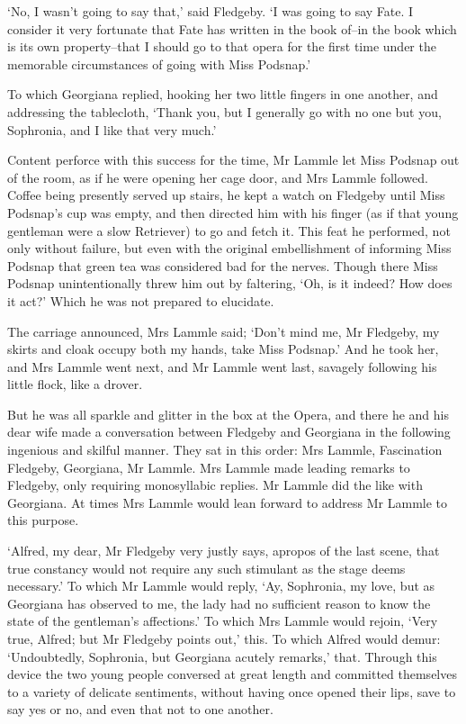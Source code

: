 ‘No, I wasn’t going to say that,’ said Fledgeby. ‘I was going to say
Fate. I consider it very fortunate that Fate has written in the book
of--in the book which is its own property--that I should go to that
opera for the first time under the memorable circumstances of going with
Miss Podsnap.’

To which Georgiana replied, hooking her two little fingers in one
another, and addressing the tablecloth, ‘Thank you, but I generally go
with no one but you, Sophronia, and I like that very much.’

Content perforce with this success for the time, Mr Lammle let Miss
Podsnap out of the room, as if he were opening her cage door, and Mrs
Lammle followed. Coffee being presently served up stairs, he kept a
watch on Fledgeby until Miss Podsnap’s cup was empty, and then directed
him with his finger (as if that young gentleman were a slow Retriever)
to go and fetch it. This feat he performed, not only without failure,
but even with the original embellishment of informing Miss Podsnap that
green tea was considered bad for the nerves. Though there Miss Podsnap
unintentionally threw him out by faltering, ‘Oh, is it indeed? How does
it act?’ Which he was not prepared to elucidate.

The carriage announced, Mrs Lammle said; ‘Don’t mind me, Mr Fledgeby, my
skirts and cloak occupy both my hands, take Miss Podsnap.’ And he
took her, and Mrs Lammle went next, and Mr Lammle went last, savagely
following his little flock, like a drover.

But he was all sparkle and glitter in the box at the Opera, and there he
and his dear wife made a conversation between Fledgeby and Georgiana in
the following ingenious and skilful manner. They sat in this order:
Mrs Lammle, Fascination Fledgeby, Georgiana, Mr Lammle. Mrs Lammle made
leading remarks to Fledgeby, only requiring monosyllabic replies. Mr
Lammle did the like with Georgiana. At times Mrs Lammle would lean
forward to address Mr Lammle to this purpose.

‘Alfred, my dear, Mr Fledgeby very justly says, apropos of the last
scene, that true constancy would not require any such stimulant as the
stage deems necessary.’ To which Mr Lammle would reply, ‘Ay, Sophronia,
my love, but as Georgiana has observed to me, the lady had no sufficient
reason to know the state of the gentleman’s affections.’ To which Mrs
Lammle would rejoin, ‘Very true, Alfred; but Mr Fledgeby points
out,’ this. To which Alfred would demur: ‘Undoubtedly, Sophronia, but
Georgiana acutely remarks,’ that. Through this device the two young
people conversed at great length and committed themselves to a variety
of delicate sentiments, without having once opened their lips, save to
say yes or no, and even that not to one another.

